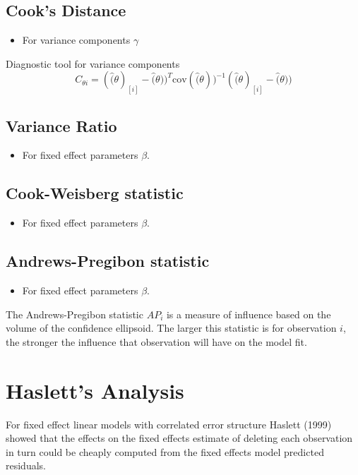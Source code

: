 \documentclass[12pt, a4paper]{article}
\begin{document}
\subsection{Cook's Distance} %
\begin{itemize}
	\item For variance components $\gamma$
\end{itemize}

Diagnostic tool for variance components
\[ C_{\theta i} =(\hat(\theta)_{[i]} - \hat(\theta))^{T}\mbox{cov}( \hat(\theta))^{-1}(\hat(\theta)_{[i]} - \hat(\theta))\]

\subsection{Variance Ratio} %
\begin{itemize}
	\item For fixed effect parameters $\beta$.
\end{itemize}

\subsection{Cook-Weisberg statistic} %
\begin{itemize}
	\item For fixed effect parameters $\beta$.
\end{itemize}

\subsection{Andrews-Pregibon statistic} %
\begin{itemize}
	\item For fixed effect parameters $\beta$.
\end{itemize}
The Andrews-Pregibon statistic $AP_{i}$ is a measure of influence based on the volume of the confidence ellipsoid.
The larger this statistic is for observation $i$, the stronger the influence that observation will have on the model fit.


\newpage
\section{Haslett's Analysis} %
For fixed effect linear models with correlated error structure Haslett (1999) showed that the effects on
the fixed effects estimate of deleting each observation in turn could be cheaply computed from the fixed effects model predicted residuals.
\end{document}
